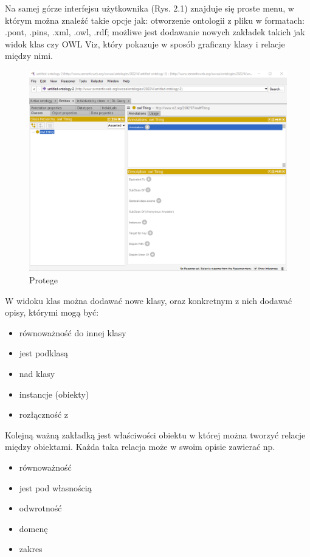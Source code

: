 \documentclass[a4paper,12pt, twoside]{book} %
\begin{document}
Na samej górze interfejsu użytkownika (Rys. 2.1) znajduje się proste menu, w którym można znaleźć takie opcje jak: otworzenie ontologii z pliku w formatach: .pont, .pins, .xml, .owl, .rdf; możliwe jest dodawanie nowych zakładek takich jak widok klas czy OWL Viz, który pokazuje w sposób graficzny klasy i relacje między nimi.
\begin{figure}[h]
	\centering
	\includegraphics[scale=0.55]{Protege.png}
	\caption{Protege}
\end{figure}
W widoku klas można dodawać nowe klasy, oraz konkretnym z nich dodawać opisy, którymi mogą być:
\begin{itemize}
	\item równoważność do innej klasy
	\item jest podklasą
	\item nad klasy
	\item instancje (obiekty)
	\item rozłączność z
\end{itemize}

Kolejną ważną zakładką jest właściwości obiektu w której można tworzyć relacje między obiektami. Każda taka relacja może w swoim opisie zawierać np.
\begin{itemize}
	\item równoważność
	\item jest pod własnością
	\item odwrotność
	\item domenę %
	\item zakres
\end{itemize}
\end{document}
